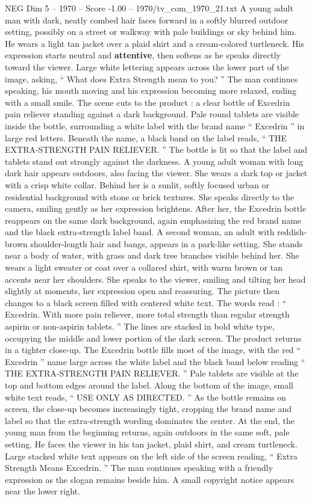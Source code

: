 \begin{textsample}{NEG Dim 5 – 1970 – Score -1.00 – 1970/tv\_com\_1970\_21.txt}  \label{ex:f5_neg_012}
A young adult man with dark, neatly combed hair faces forward in a softly blurred outdoor setting, possibly on a street or walkway with pale buildings or sky behind him.
He wears a light tan jacket over a plaid shirt and a cream-colored turtleneck.
His expression starts neutral and \textbf{attentive}, then softens as he speaks directly toward the viewer.
Large white lettering appears across the lower part of the image, asking, “ What does Extra Strength mean to you? ” The man continues speaking, his mouth moving and his expression becoming more relaxed, ending with a small smile.
The scene cuts to the product : a clear bottle of Excedrin pain reliever standing against a dark background.
Pale round tablets are visible inside the bottle, surrounding a white label with the brand name “ Excedrin ” in large red letters.
Beneath the name, a black band on the label reads, “ THE EXTRA-STRENGTH PAIN RELIEVER. ” The bottle is lit so that the label and tablets stand out strongly against the darkness.
A young adult woman with long dark hair appears outdoors, also facing the viewer.
She wears a dark top or jacket with a crisp white collar.
Behind her is a sunlit, softly focused urban or residential background with stone or brick textures.
She speaks directly to the camera, smiling gently as her expression brightens.
After her, the Excedrin bottle reappears on the same dark background, again emphasizing the red brand name and the black extra-strength label band.
A second woman, an adult with reddish-brown shoulder-length hair and bangs, appears in a park-like setting.
She stands near a body of water, with grass and dark tree branches visible behind her.
She wears a light sweater or coat over a collared shirt, with warm brown or tan accents near her shoulders.
She speaks to the viewer, smiling and tilting her head slightly at moments, her expression open and reassuring.
The picture then changes to a black screen filled with centered white text.
The words read : “ Excedrin.
With more pain reliever, more total strength than regular strength aspirin or non-aspirin tablets. ” The lines are stacked in bold white type, occupying the middle and lower portion of the dark screen.
The product returns in a tighter close-up.
The Excedrin bottle fills most of the image, with the red “ Excedrin ” name large across the white label and the black band below reading “ THE EXTRA-STRENGTH PAIN RELIEVER. ” Pale tablets are visible at the top and bottom edges around the label.
Along the bottom of the image, small white text reads, “ USE ONLY AS DIRECTED. ” As the bottle remains on screen, the close-up becomes increasingly tight, cropping the brand name and label so that the extra-strength wording dominates the center.
At the end, the young man from the beginning returns, again outdoors in the same soft, pale setting.
He faces the viewer in his tan jacket, plaid shirt, and cream turtleneck.
Large stacked white text appears on the left side of the screen reading, “ Extra Strength Means Excedrin. ” The man continues speaking with a friendly expression as the slogan remains beside him.
A small copyright notice appears near the lower right.

\end{textsample}

